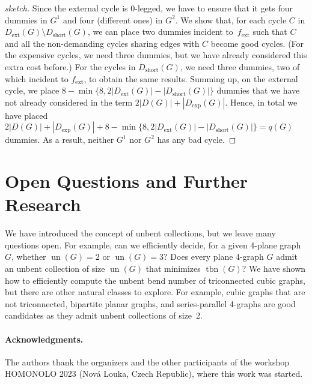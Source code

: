 \documentclass[runningheads]{llncs}
\newcommand\lncs[1]{#1}
\newcommand\lip[1]{}
\newcommand{\un}{\operatorname{un}}
\newcommand{\tbn}{\operatorname{tbn}}
\newcommand{\ext}{\operatorname{ext}}
\newcommand{\short}{\operatorname{short}}
\begin{document}
\begin{proof}[sketch]
Since the external cycle is 0-legged, we have to ensure that it gets four dummies in $G^1$ and four (different ones) in $G^2$.
We show that, for each cycle $C$ in $D_{\ext}(G)\setminus D_{\short}(G)$, we can place two dummies incident to~$f_{\ext}$ such that $C$ and all the non-demanding cycles sharing edges with $C$ become good cycles. 
(For the expensive cycles, we need three dummies, but we have already considered this extra cost before.)
For the cycles in $D_{\short}(G)$, we need three dummies, two of which incident to $f_{\ext}$, to obtain the same results. 
Summing up, on the external cycle, we place $8-\min\{8, 2|D_{\ext}(G)|-|D_{\short}(G)|\}$ dummies that we have not already considered in the term $2|D(G)|+|D_{\exp}(G)|$. 
Hence, in total we have placed  $2|D(G)|+|D_{\exp}(G)|+8-\min\{8, 2|D_{\ext}(G)|-|D_{\short}(G)|\}=q(G)$ dummies. As a result, neither $G^1$ nor $G^2$ has any bad cycle. 
\end{proof}


\section{Open Questions and Further Research}
\label{se:conclusion}

We have introduced the concept of unbent collections, but we leave many questions open.
For example, can we efficiently decide, for a given 4-plane graph~$G$,
whether $\un(G) = 2$ or $\un(G) = 3$?
Does every plane 4-graph $G$ admit an unbent collection of size $\un(G)$ that minimizes $\tbn(G)$? 
We have shown how to efficiently compute the unbent bend number of triconnected cubic graphs, but there are other natural classes to explore. 
For example, cubic graphs that are not triconnected, bipartite planar graphs, and series-parallel 4-graphs are good candidates as they admit unbent collections of size~2. %

  
  

\paragraph{Acknowledgments.}  The authors thank the organizers and the other participants of the workshop HOMONOLO 2023 (Nová Louka, Czech Republic), where this work was started.

\lip{}
\lncs{ }


\appendix
\end{document}
